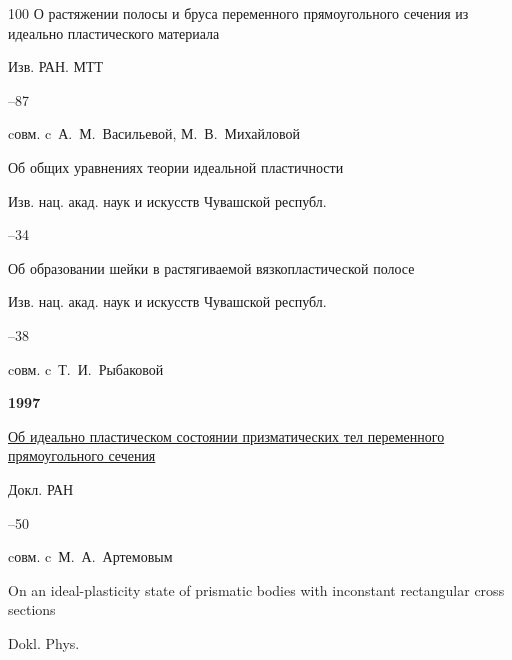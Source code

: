 \begin{thebibliography}{100}
\paper О растяжении полосы и бруса переменного прямоугольного сечения из идеально пластического материала 

\jour Изв. РАН. МТТ



–87 

\miscnote cовм. c~А.~М.~Васильевой, М.~В.~Михайловой




\paper Об общих уравнениях теории идеальной пластичности 

\jour Изв. нац. акад. наук и искусств Чувашской республ.



–34




\paper Об образовании шейки в растягиваемой вязкопластической полосе 

\jour Изв. нац. акад. наук и искусств Чувашской республ.



–38 

\miscnote cовм. c~Т.~И.~Рыбаковой



\item[] \centerline{\bf 1997}




\paper \href{https://zbmath.org/?q=an:0935.74019}{Об идеально пластическом состоянии призматических тел переменного прямоугольного сечения}

\jour Докл. РАН




–50 

\miscnote cовм. c~М.~А.~Артемовым


\transl


\paper On an ideal-plasticity state of prismatic bodies with inconstant rectangular cross sections

\jour Dokl. Phys. 


\end{thebibliography}
